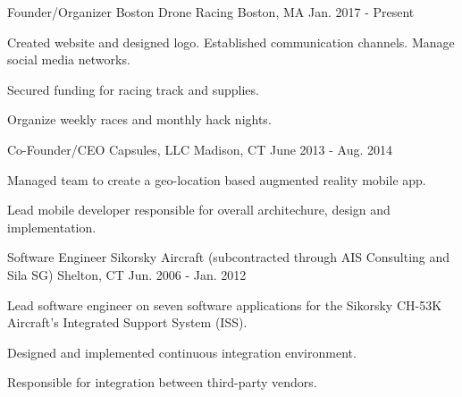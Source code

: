 

\begin{cventries}

  \cventry
    {Founder/Organizer} %
    {Boston Drone Racing} %
    {Boston, MA} %
    {Jan. 2017 - Present} %
    {
      \begin{cvitems} %
      \item {Created website and designed logo. Established communication channels. Manage social
              media networks. }
      \item {Secured funding for racing track and supplies. }
      \item {Organize weekly races and monthly hack nights.}
      \end{cvitems}
    }

  \cventry
    {Co-Founder/CEO} %
    {Capsules, LLC} %
    {Madison, CT} %
    {June 2013 - Aug. 2014} %
    {
      \begin{cvitems} %
      \item {Managed team to create a geo-location based augmented reality
              mobile app.}
      \item {Lead mobile developer responsible for overall architechure, design and implementation.}
      \end{cvitems}
    }

  \cventry
    {Software Engineer} %
    {Sikorsky Aircraft {\scriptsize\textnormal{(subcontracted through AIS Consulting
                and Sila SG)}}} %
    {Shelton, CT} %
    {Jun. 2006 - Jan. 2012} %
    {
      \begin{cvitems} %
      \item {Lead software engineer on seven software applications for the Sikorsky CH-53K Aircraft's Integrated Support System (ISS). }
        \item {Designed and implemented continuous integration environment.}
        \item {Responsible for integration between third-party vendors.}
      \end{cvitems}
    }


\end{cventries}
